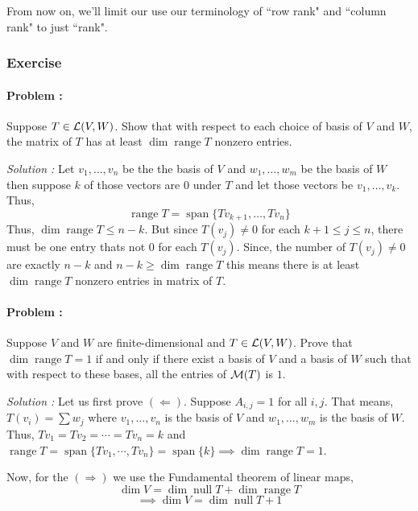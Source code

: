 \begin{remark}
    From now on, we'll limit our use our terminology of ``row rank" and ``column rank" to just ``rank". 
\end{remark}

\eject
\subsubsection{Exercise}

\paragraph{Problem :} Suppose $T \in \operatorname{\mathcal{L}}(V,W)$. Show that with respect to each choice of basis of $V$ and $W$, the matrix of $T$ has 
at least $\dim \operatorname{range} T$ nonzero entries.  

\vspace{4mm}
\textit{Solution :} Let $v_1, \ldots, v_n$ be the the basis of $V$ and $w_1, \ldots, w_m$ be the basis of $W$ then suppose $k$ of those
vectors are $0$ under $T$ and let those vectors be $v_1, \ldots, v_k$. Thus, 
\[ \operatorname{range} T = \operatorname{span} \{Tv_{k+1}, \ldots, Tv_{n}\} \]
Thus, $\dim \operatorname{range} T \le n-k$. But since $T(v_j) \neq 0$ for each $k+1 \le j \le n$, there must be one entry thats not $0$
for each $T(v_j)$. Since, the number of $T(v_j) \neq 0$ are exactly $n-k$ and $n-k \ge \dim \operatorname{range} T$ this means there is 
at least $\dim \operatorname{range} T$ nonzero entries in matrix of $T$.

\paragraph{Problem :} Suppose $V$ and $W$ are finite-dimensional and $T \in \operatorname{\mathcal{L}}(V,W)$. Prove that $\dim \operatorname{range} T = 1$ if and 
only if there exist a basis of $V$ and a basis of $W$ such that with respect to these bases, all the entries of $\operatorname{\mathcal{M}}(T)$ is $1$.

\vspace{4mm}
\textit{Solution :} Let us first prove $(\Leftarrow)$. Suppose $A_{i,j}=1$ for all $i,j$. That means, $T(v_i) = \sum w_j$ where 
$v_1,\ldots,v_n$ is the basis of $V$ and $w_1,\ldots,w_m$ is the basis of $W$. Thus, $Tv_1=Tv_2=\cdots=Tv_n=k$ and
$\operatorname{range} T = \operatorname{span}\{Tv_1,\cdots,Tv_n\} = \operatorname{span}\{k\} \implies \dim \operatorname{range} T = 1$.

Now, for the $(\Rightarrow)$ we use the Fundamental theorem of linear maps,
\[ \dim V = \dim \operatorname{null} T + \dim \operatorname{range} T  \]
\[ \implies \dim V = \dim \operatorname{null} T + 1 \]

